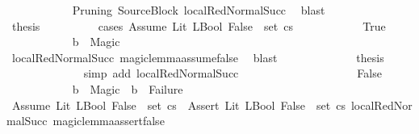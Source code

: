 \begin{isabellebody}
\ \ \ \ \ \ \ \ \ \ \isamarkupfalse%
\ Pruning\ SourceBlock\ local{\isachardot}{\kern0pt}RedNormalSucc{\isacharparenleft}{\kern0pt}{}{\isacharparenright}{\kern0pt}\ \isamarkupfalse%
\ blast\isanewline
\ \ \ \ \ \ \ \ \isamarkupfalse%
\ \isamarkupfalse%
\ {\isacharquery}{\kern0pt}thesis\isanewline
\ \ \ \ \ \ \ \ \isamarkupfalse%
\ {\isacharparenleft}{\kern0pt}cases\ {\isachardoublequoteopen}{\isacharparenleft}{\kern0pt}Assume\ {\isacharparenleft}{\kern0pt}Lit\ {\isacharparenleft}{\kern0pt}LBool\ False{\isacharparenright}{\kern0pt}{\isacharparenright}{\kern0pt}{\isacharparenright}{\kern0pt}\ {\isasymin}\ set\ {\isacharparenleft}{\kern0pt}cs{\isacharparenright}{\kern0pt}{\isachardoublequoteclose}{\isacharparenright}{\kern0pt}\isanewline
\ \ \ \ \ \ \ \ \ \ \isamarkupfalse%
\ True\isanewline
\ \ \ \ \ \ \ \ \ \ \isamarkupfalse%
\ {\isachardoublequoteopen}b\ {\isacharequal}{\kern0pt}\ Magic{\isachardoublequoteclose}\isanewline
\ \ \ \ \ \ \ \ \ \ \ \ \isamarkupfalse%
\ local{\isachardot}{\kern0pt}RedNormalSucc{\isacharparenleft}{\kern0pt}{}{\isacharparenright}{\kern0pt}\ magic{\isacharunderscore}{\kern0pt}lemma{\isacharunderscore}{\kern0pt}assume{\isacharunderscore}{\kern0pt}false\ \isamarkupfalse%
\ blast\isanewline
\ \ \ \ \ \ \ \ \ \ \isamarkupfalse%
\ \isamarkupfalse%
\ {\isacharquery}{\kern0pt}thesis\isanewline
\ \ \ \ \ \ \ \ \ \ \ \ \isamarkupfalse%
\ {\isacharparenleft}{\kern0pt}simp\ add{\isacharcolon}{\kern0pt}\ local{\isachardot}{\kern0pt}RedNormalSucc{\isacharparenleft}{\kern0pt}{}{\isacharparenright}{\kern0pt}{\isacharparenright}{\kern0pt}\isanewline
\ \ \ \ \ \ \ \ \isamarkupfalse%
\isanewline
\ \ \ \ \ \ \ \ \ \ \isamarkupfalse%
\ False\isanewline
\ \ \ \ \ \ \ \ \ \ \isamarkupfalse%
\ {\isachardoublequoteopen}b\ {\isacharequal}{\kern0pt}\ Magic\ {\isasymor}\ b\ {\isacharequal}{\kern0pt}\ Failure{\isachardoublequoteclose}\isanewline
\ \ \ \ \ \ \ \ \ \ \ \ \isamarkupfalse%
\ {\isacartoucheopen}Assume\ {\isacharparenleft}{\kern0pt}Lit\ {\isacharparenleft}{\kern0pt}LBool\ False{\isacharparenright}{\kern0pt}{\isacharparenright}{\kern0pt}\ {\isasymin}\ set\ cs\ {\isasymor}\ Assert\ {\isacharparenleft}{\kern0pt}Lit\ {\isacharparenleft}{\kern0pt}LBool\ False{\isacharparenright}{\kern0pt}{\isacharparenright}{\kern0pt}\ {\isasymin}\ set\ cs{\isacartoucheclose}\ local{\isachardot}{\kern0pt}RedNormalSucc{\isacharparenleft}{\kern0pt}{}{\isacharparenright}{\kern0pt}\ magic{\isacharunderscore}{\kern0pt}lemma{\isacharunderscore}{\kern0pt}assert{\isacharunderscore}{\kern0pt}false\ \isanewline

\end{isabellebody}
